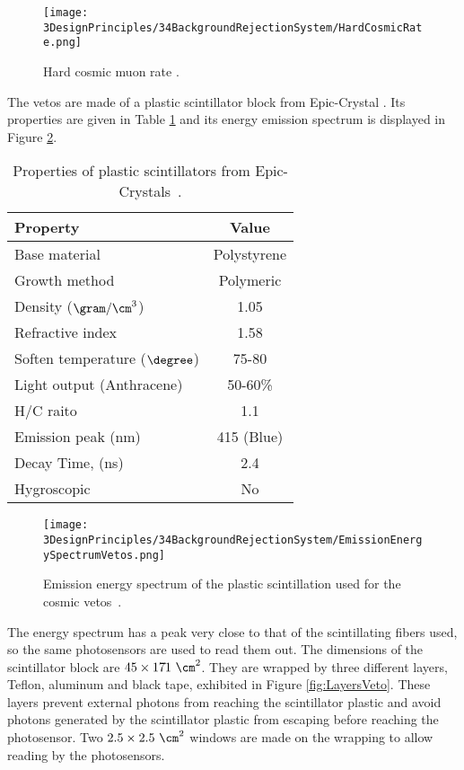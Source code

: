 \begin{figure}[h]
\centering
\texttt{[image: 3DesignPrinciples/34BackgroundRejectionSystem/HardCosmicRate.png]}
\caption{Hard cosmic muon rate \cite{HardCosmicMuonRatePlot}.\label{fig:HardCoscmicRate}}
\end{figure}

The vetos are made of a plastic scintillator block from Epic-Crystal \cite{ScintillatorVeto}. Its properties are given in Table \ref{tab:ParametersScintillatorVeto} and its energy emission spectrum is displayed in Figure \ref{fig:EmissionEnergySpectrumVeto}.

\begin{table}[htbp]
\centering{}%
\begin{tabular}{lc}
\toprule 
Property & Value \tabularnewline
\midrule
\midrule 
Base material & Polystyrene \tabularnewline
Growth method & Polymeric \tabularnewline
Density ($\gram/\cm^3$)& 1.05 \tabularnewline
Refractive index & 1.58 \tabularnewline
Soften temperature ($\degree$) & 75-80 \tabularnewline
Light output (Anthracene) & 50-60\% \tabularnewline
H/C raito & 1.1 \tabularnewline
Emission peak (nm) & 415 (Blue) \tabularnewline
Decay Time, (ns) & 2.4 \tabularnewline
Hygroscopic & No \tabularnewline
\bottomrule
\end{tabular}
\caption{Properties of plastic scintillators from Epic-Crystals~\cite{ScintillatorVeto}.}
\label{tab:ParametersScintillatorVeto}
\end{table}

\begin{figure}[]
\centering
\texttt{[image: 3DesignPrinciples/34BackgroundRejectionSystem/EmissionEnergySpectrumVetos.png]}
\caption{Emission energy spectrum of the plastic scintillation used for the cosmic vetos\label{fig:EmissionEnergySpectrumVeto}~\cite{ScintillatorVeto}.}
\end{figure}

The energy spectrum has a peak very close to that of the scintillating fibers used, so the same photosensors are used to read them out. The dimensions of the scintillator block are $45 \times 17 \dot{} 1~\cm^2$. They are wrapped by three different layers, Teflon, aluminum and black tape, exhibited in Figure \ref{fig:LayersVeto}. These layers prevent external photons from reaching the scintillator plastic and avoid photons generated by the scintillator plastic from escaping before reaching the photosensor. Two $2.5\times 2.5 ~\cm^2$ windows are made on the wrapping to allow reading by the photosensors.


